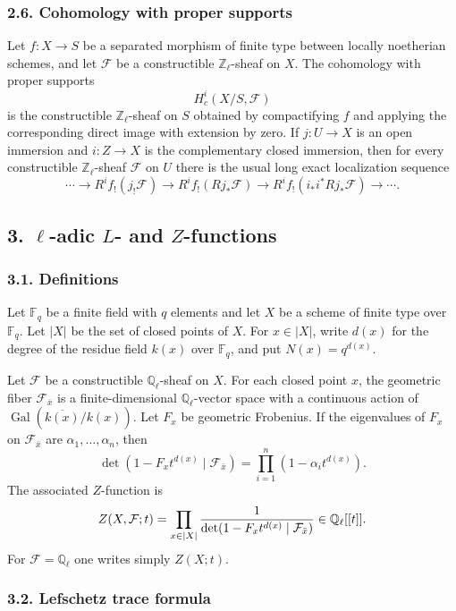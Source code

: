 \documentclass[12pt]{article}
\newcommand{\bZ}{\mathbb Z}
\newcommand{\bQ}{\mathbb Q}
\newcommand{\bF}{\mathbb F}
\newcommand{\cF}{\mathcal F}
\newcommand{\Gal}{\operatorname{Gal}}
\begin{document}
\subsubsection*{2.6. Cohomology with proper supports}

Let $f:X\to S$ be a separated morphism of finite type between locally noetherian
schemes, and let $\cF$ be a constructible $\bZ_\ell$-sheaf on $X$. The cohomology
with proper supports
\[
      H_c^i(X/S,\cF)
\]
is the constructible $\bZ_\ell$-sheaf on $S$ obtained by compactifying $f$ and
applying the corresponding direct image with extension by zero. If
$j:U\to X$ is an open immersion and $i:Z\to X$ is the complementary closed
immersion, then for every constructible $\bZ_\ell$-sheaf $\cF$ on $U$ there is the
usual long exact localization sequence
\[
\cdots\to R^if_!(j_!\cF)\to R^if_!(Rj_*\cF)\to
R^if_!(i_*i^*Rj_*\cF)\to\cdots .
\]

\subsection*{3. $\ell$-adic $L$- and $Z$-functions}

\subsubsection*{3.1. Definitions}

Let $\bF_q$ be a finite field with $q$ elements and let $X$ be a scheme of finite
type over $\bF_q$. Let $|X|$ be the set of closed points of $X$. For
$x\in|X|$, write $d(x)$ for the degree of the residue field $k(x)$ over $\bF_q$, and
put $N(x)=q^{d(x)}$.

Let $\cF$ be a constructible $\bQ_\ell$-sheaf on $X$. For each closed point $x$, the
geometric fiber $\cF_{\bar x}$ is a finite-dimensional $\bQ_\ell$-vector space with
a continuous action of $\Gal(\overline{k(x)}/k(x))$. Let $F_x$ be geometric
Frobenius. If the eigenvalues of $F_x$ on $\cF_{\bar x}$ are
$\alpha_1,\ldots,\alpha_n$, then
\[
  \det(1-F_xt^{d(x)}\mid \cF_{\bar x})=\prod_{i=1}^n(1-\alpha_i t^{d(x)}).
\]
The associated $Z$-function is
\[
      Z(X,\cF;t)=\prod_{x\in|X|}
      {1\over\det(1-F_xt^{d(x)}\mid\cF_{\bar x})}\in\bQ_\ell[[t]].
\]
For $\cF=\bQ_\ell$ one writes simply $Z(X;t)$.

\subsubsection*{3.2. Lefschetz trace formula}
\end{document}
